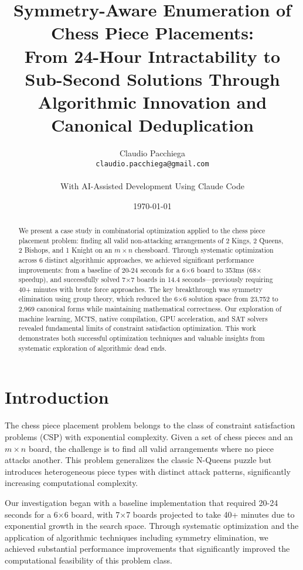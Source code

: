 \documentclass[12pt,a4paper]{article}
\title{Symmetry-Aware Enumeration of Chess Piece Placements:\\
From 24-Hour Intractability to Sub-Second Solutions Through\\
Algorithmic Innovation and Canonical Deduplication}
\author{Claudio Pacchiega\\
\texttt{claudio.pacchiega@gmail.com}\\
\\
\small{With AI-Assisted Development Using Claude Code}}
\date{\today}
\theoremstyle{definition}
\begin{document}
\maketitle

\begin{abstract}
We present a case study in combinatorial optimization applied to the chess piece placement problem: finding all valid non-attacking arrangements of 2 Kings, 2 Queens, 2 Bishops, and 1 Knight on an $m \times n$ chessboard. Through systematic optimization across 6 distinct algorithmic approaches, we achieved significant performance improvements: from a baseline of 20-24 seconds for a 6$\times$6 board to 353ms (68$\times$ speedup), and successfully solved 7$\times$7 boards in 14.4 seconds---previously requiring 40+ minutes with brute force approaches. The key breakthrough was symmetry elimination using group theory, which reduced the 6$\times$6 solution space from 23,752 to 2,969 canonical forms while maintaining mathematical correctness. Our exploration of machine learning, MCTS, native compilation, GPU acceleration, and SAT solvers revealed fundamental limits of constraint satisfaction optimization. This work demonstrates both successful optimization techniques and valuable insights from systematic exploration of algorithmic dead ends.
\end{abstract}

\section{Introduction}

The chess piece placement problem belongs to the class of constraint satisfaction problems (CSP) with exponential complexity. Given a set of chess pieces and an $m \times n$ board, the challenge is to find all valid arrangements where no piece attacks another. This problem generalizes the classic N-Queens puzzle but introduces heterogeneous piece types with distinct attack patterns, significantly increasing computational complexity.

Our investigation began with a baseline implementation that required 20-24 seconds for a 6$\times$6 board, with 7$\times$7 boards projected to take 40+ minutes due to exponential growth in the search space. Through systematic optimization and the application of algorithmic techniques including symmetry elimination, we achieved substantial performance improvements that significantly improved the computational feasibility of this problem class.
\end{document}
